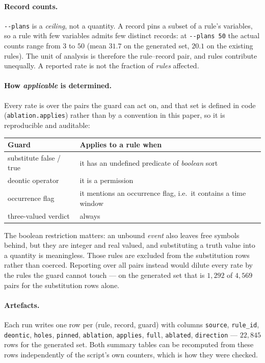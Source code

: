 \paragraph{Record counts.}
\texttt{-{}-plans} is a \emph{ceiling}, not a quantity. A record pins a subset
of a rule's variables, so a rule with few variables admits few distinct
records: at \texttt{-{}-plans 50} the actual counts range from $3$ to $50$
(mean $31.7$ on the generated set, $20.1$ on the existing rules). The unit of
analysis is therefore the rule--record pair, and rules contribute unequally. A
reported rate is not the fraction of \emph{rules} affected.

\paragraph{How \emph{applicable} is determined.}
Every rate is over the pairs the guard can act on, and that set is defined in
code (\texttt{ablation.applies}) rather than by a convention in this paper, so
it is reproducible and auditable:
\begin{center}
\begin{tabular}{ll}
  \toprule
  Guard & Applies to a rule when \\
  \midrule
  substitute \textsf{false} / \textsf{true}
    & it has an undefined predicate of \emph{boolean} sort \\
  deontic operator
    & it is a permission \\
  occurrence flag
    & it mentions an occurrence flag, i.e.\ it contains a time window \\
  three-valued verdict
    & always \\
  \bottomrule
\end{tabular}
\end{center}
The boolean restriction matters: an unbound \emph{event} also leaves free
symbols behind, but they are integer and real valued, and substituting a truth
value into a quantity is meaningless. Those rules are excluded from the
substitution rows rather than coerced. Reporting over all pairs instead would
dilute every rate by the rules the guard cannot touch --- on the generated set
that is $1{,}292$ of $4{,}569$ pairs for the substitution rows alone.

\paragraph{Artefacts.}
Each run writes one row per (rule, record, guard) with columns
\texttt{source}, \texttt{rule\_id}, \texttt{deontic}, \texttt{holes},
\texttt{pinned}, \texttt{ablation}, \texttt{applies}, \texttt{full},
\texttt{ablated}, \texttt{direction} --- $22{,}845$ rows for the generated set.
Both summary tables can be recomputed from these rows independently of the
script's own counters, which is how they were checked.


